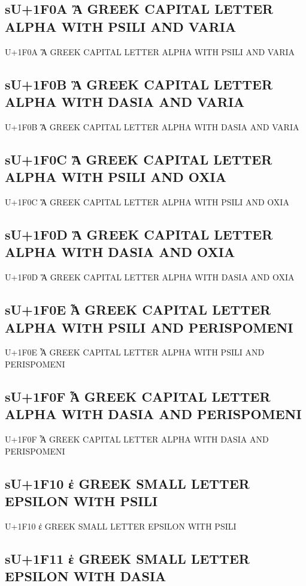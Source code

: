 \subsection{sU+1F0A Ἂ GREEK CAPITAL LETTER ALPHA WITH PSILI AND VARIA}

U+1F0A Ἂ GREEK CAPITAL LETTER ALPHA WITH PSILI AND VARIA

\subsection{sU+1F0B Ἃ GREEK CAPITAL LETTER ALPHA WITH DASIA AND VARIA}

U+1F0B Ἃ GREEK CAPITAL LETTER ALPHA WITH DASIA AND VARIA

\subsection{sU+1F0C Ἄ GREEK CAPITAL LETTER ALPHA WITH PSILI AND OXIA}

U+1F0C Ἄ GREEK CAPITAL LETTER ALPHA WITH PSILI AND OXIA

\subsection{sU+1F0D Ἅ GREEK CAPITAL LETTER ALPHA WITH DASIA AND OXIA}

U+1F0D Ἅ GREEK CAPITAL LETTER ALPHA WITH DASIA AND OXIA

\subsection{sU+1F0E Ἆ GREEK CAPITAL LETTER ALPHA WITH PSILI AND PERISPOMENI}

U+1F0E Ἆ GREEK CAPITAL LETTER ALPHA WITH PSILI AND PERISPOMENI

\subsection{sU+1F0F Ἇ GREEK CAPITAL LETTER ALPHA WITH DASIA AND PERISPOMENI}

U+1F0F Ἇ GREEK CAPITAL LETTER ALPHA WITH DASIA AND PERISPOMENI

\subsection{sU+1F10 ἐ GREEK SMALL LETTER EPSILON WITH PSILI}

U+1F10 ἐ GREEK SMALL LETTER EPSILON WITH PSILI

\subsection{sU+1F11 ἑ GREEK SMALL LETTER EPSILON WITH DASIA}

